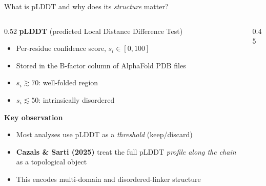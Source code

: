\documentclass[aspectratio=169, 10pt]{beamer}
\begin{document}
\begin{frame}{What is pLDDT and why does its \emph{structure} matter?}
  \begin{columns}[T]
    \begin{column}{0.52\textwidth}
      \textbf{pLDDT} (predicted Local Distance Difference Test)
      \begin{itemize}\setlength{\itemsep}{0pt}
        \item Per-residue confidence score, $s_i \in [0, 100]$
        \item Stored in the B-factor column of AlphaFold PDB files
        \item $s_i \gtrsim 70$: well-folded region
        \item $s_i \lesssim 50$: intrinsically disordered
      \end{itemize}
      \vspace{2pt}
      \textbf{Key observation}
      \begin{itemize}\setlength{\itemsep}{0pt}
        \item Most analyses use pLDDT as a \emph{threshold} (keep/discard)
        \item \textbf{Cazals \& Sarti (2025)} treat the full pLDDT
              \emph{profile along the chain} as a topological object
        \item This encodes multi-domain and disordered-linker structure
      \end{itemize}
    \end{column}
    \begin{column}{0.45\textwidth}
      \vspace{-4pt}
\end{column}
\end{columns}
\end{frame}
\end{document}
